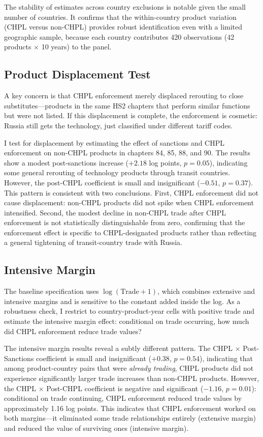 \documentclass[12pt]{article}
\begin{document}
The stability of estimates across country exclusions is notable given the small number of countries. It confirms that the within-country product variation (CHPL versus non-CHPL) provides robust identification even with a limited geographic sample, because each country contributes 420 observations (42 products $\times$ 10 years) to the panel.

\subsection{Product Displacement Test}

A key concern is that CHPL enforcement merely displaced rerouting to close substitutes---products in the same HS2 chapters that perform similar functions but were not listed. If this displacement is complete, the enforcement is cosmetic: Russia still gets the technology, just classified under different tariff codes.

I test for displacement by estimating the effect of sanctions and CHPL enforcement on non-CHPL products in chapters 84, 85, 88, and 90. The results show a modest post-sanctions increase ($+2.18$ log points, $p = 0.05$), indicating some general rerouting of technology products through transit countries. However, the post-CHPL coefficient is small and insignificant ($-0.51$, $p = 0.37$). This pattern is consistent with two conclusions. First, CHPL enforcement did not cause displacement: non-CHPL products did not spike when CHPL enforcement intensified. Second, the modest decline in non-CHPL trade after CHPL enforcement is not statistically distinguishable from zero, confirming that the enforcement effect is specific to CHPL-designated products rather than reflecting a general tightening of transit-country trade with Russia.

\subsection{Intensive Margin}

The baseline specification uses $\log(\text{Trade} + 1)$, which combines extensive and intensive margins and is sensitive to the constant added inside the log. As a robustness check, I restrict to country-product-year cells with positive trade and estimate the intensive margin effect: conditional on trade occurring, how much did CHPL enforcement reduce trade values?

The intensive margin results reveal a subtly different pattern. The CHPL $\times$ Post-Sanctions coefficient is small and insignificant ($+0.38$, $p = 0.54$), indicating that among product-country pairs that were \textit{already trading}, CHPL products did not experience significantly larger trade increases than non-CHPL products. However, the CHPL $\times$ Post-CHPL coefficient is negative and significant ($-1.16$, $p = 0.01$): conditional on trade continuing, CHPL enforcement reduced trade values by approximately 1.16 log points. This indicates that CHPL enforcement worked on both margins---it eliminated some trade relationships entirely (extensive margin) and reduced the value of surviving ones (intensive margin).
\end{document}
